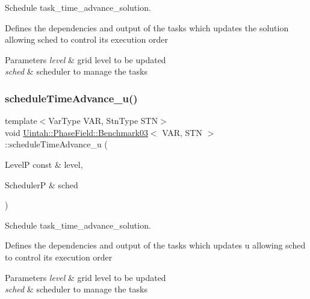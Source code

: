 Schedule task\+\_\+time\+\_\+advance\+\_\+solution. 

Defines the dependencies and output of the tasks which updates the solution allowing sched to control its execution order


\begin{DoxyParams}{Parameters}
{\em level} & grid level to be updated \\
\hline
{\em sched} & scheduler to manage the tasks \\
\hline
\end{DoxyParams}
\mbox{\label{classUintah_1_1PhaseField_1_1Benchmark03_acb3c3cdb91b958e3bb4bcfdcc809e72b}} 
\subsubsection{\texorpdfstring{schedule\+Time\+Advance\+\_\+u()}{scheduleTimeAdvance\_u()}}
{\footnotesize\ttfamily template$<$Var\+Type V\+AR, Stn\+Type S\+TN$>$ \\
void \hyperlink{classUintah_1_1PhaseField_1_1Benchmark03}{Uintah\+::\+Phase\+Field\+::\+Benchmark03}$<$ V\+AR, S\+TN $>$\+::schedule\+Time\+Advance\+\_\+u (\begin{DoxyParamCaption}\item[{LevelP const \&}]{level,  }\item[{SchedulerP \&}]{sched }\end{DoxyParamCaption})\hspace{0.3cm}{\ttfamily [protected]}}



Schedule task\+\_\+time\+\_\+advance\+\_\+solution. 

Defines the dependencies and output of the tasks which updates u allowing sched to control its execution order


\begin{DoxyParams}{Parameters}
{\em level} & grid level to be updated \\
\hline
{\em sched} & scheduler to manage the tasks \\
\hline
\end{DoxyParams}
\mbox{\label{classUintah_1_1PhaseField_1_1Benchmark03_a0c433430de13f1b4fbd2d671b13a192a}} 
